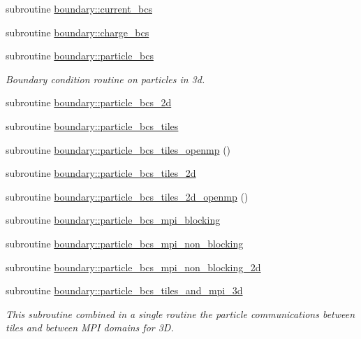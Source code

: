 \begin{DoxyCompactItemize}
\item 
subroutine \hyperlink{namespaceboundary_a2bd382bbf256b1208d4fd3721c37ad08}{boundary\+::current\+\_\+bcs}
\item 
subroutine \hyperlink{namespaceboundary_a0b6d77029b51dd2a0e853c265885ab6c}{boundary\+::charge\+\_\+bcs}
\item 
subroutine \hyperlink{namespaceboundary_a9e7ba00d025d595683607b3ccd95bcb3}{boundary\+::particle\+\_\+bcs}
\begin{DoxyCompactList}\small\item\em Boundary condition routine on particles in 3d. \end{DoxyCompactList}\item 
subroutine \hyperlink{namespaceboundary_aad89819169dca0b0ae8cf04748a86fb1}{boundary\+::particle\+\_\+bcs\+\_\+2d}
\item 
subroutine \hyperlink{namespaceboundary_added6cf2ea0ffc7ab618c3d9af16fade}{boundary\+::particle\+\_\+bcs\+\_\+tiles}
\item 
subroutine \hyperlink{namespaceboundary_af6d7a140eef6818609e44869b67cd3a7}{boundary\+::particle\+\_\+bcs\+\_\+tiles\+\_\+openmp} ()
\item 
subroutine \hyperlink{namespaceboundary_afb4e6ab09e288dab2bb9ce2d731e276f}{boundary\+::particle\+\_\+bcs\+\_\+tiles\+\_\+2d}
\item 
subroutine \hyperlink{namespaceboundary_a9f9517df19ef503bb2a69e63aeec91d4}{boundary\+::particle\+\_\+bcs\+\_\+tiles\+\_\+2d\+\_\+openmp} ()
\item 
subroutine \hyperlink{namespaceboundary_a1789d63402ac897697791a2fca4fa8e6}{boundary\+::particle\+\_\+bcs\+\_\+mpi\+\_\+blocking}
\item 
subroutine \hyperlink{namespaceboundary_aac32f7f65f1998963706f9d5776d29d2}{boundary\+::particle\+\_\+bcs\+\_\+mpi\+\_\+non\+\_\+blocking}
\item 
subroutine \hyperlink{namespaceboundary_a3293856926030dfea9e8ca05c61e1a5a}{boundary\+::particle\+\_\+bcs\+\_\+mpi\+\_\+non\+\_\+blocking\+\_\+2d}
\item 
subroutine \hyperlink{namespaceboundary_ac117306978e83b787afba90c3ac038f4}{boundary\+::particle\+\_\+bcs\+\_\+tiles\+\_\+and\+\_\+mpi\+\_\+3d}
\begin{DoxyCompactList}\small\item\em This subroutine combined in a single routine the particle communications between tiles and between M\+PI domains for 3D. \end{DoxyCompactList}\end{DoxyCompactItemize}
